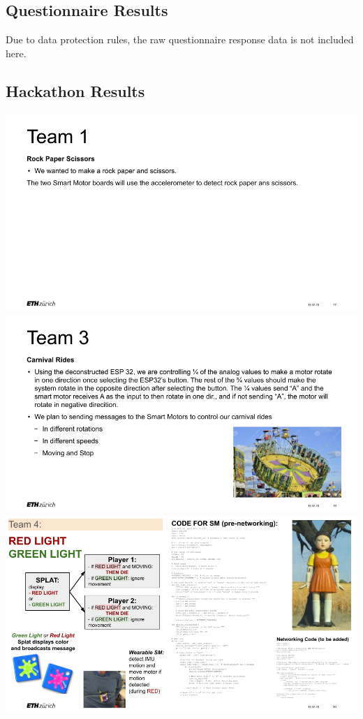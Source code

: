 \subsection*{Questionnaire Results}
Due to data protection rules, the raw questionnaire response data is not included here.

\subsection*{Hackathon Results}
\includegraphics[width=\linewidth]{overleaf/images/Hackathon21.png}
\newpage
\includegraphics[width=\linewidth]{overleaf/images/Hackathon23.png}
\includegraphics[width=\linewidth]{overleaf/images/Hackathon24.png}